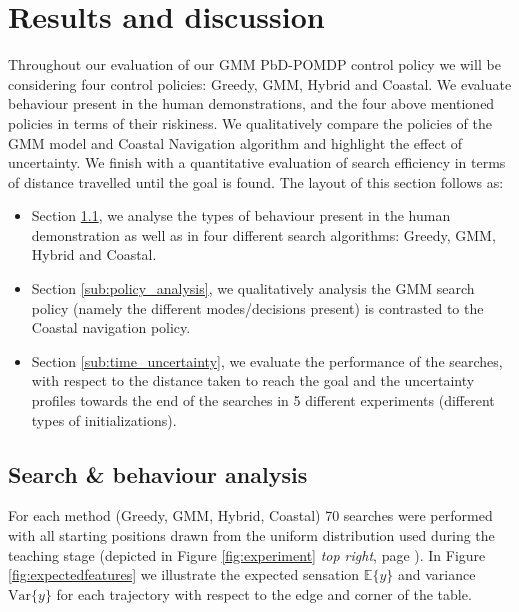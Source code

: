 \section{Results and discussion}\label{chap3:results}

Throughout our evaluation of our GMM PbD-POMDP control policy we will be considering four control policies: Greedy, GMM, Hybrid and 
Coastal. We evaluate behaviour present in the human demonstrations, and the four above mentioned policies in terms 
of their riskiness. We qualitatively compare the policies of the GMM model and Coastal Navigation algorithm and highlight the 
effect of uncertainty. We finish with a quantitative evaluation of search efficiency in terms of distance travelled until the goal is found.
The layout of this section follows as:
\begin{itemize}
 \item Section \ref{sub:search_behaviour}, we analyse the types of behaviour present in the human demonstration as well as in
four different search algorithms: Greedy, GMM, Hybrid and Coastal.
 \item Section \ref{sub:policy_analysis}, we qualitatively analysis the GMM search policy (namely the different modes/decisions present) 
 is contrasted to the Coastal navigation policy.
 \item Section \ref{sub:time_uncertainty}, we evaluate the performance of the searches, with respect to the distance taken to reach the goal and the uncertainty profiles towards the end of 
the searches in 5 different experiments (different types of initializations). 
\end{itemize}
\FloatBarrier
\subsection{Search \& behaviour analysis}\label{sub:search_behaviour}

For each method (Greedy, GMM, Hybrid, Coastal) 70 searches were performed with all starting positions drawn from the
uniform distribution used during the teaching stage (depicted in Figure \ref{fig:experiment} \textit{top right}, page \pageref{fig:experiment}). 
In Figure \ref{fig:expectedfeatures} we illustrate the expected sensation $\mathbb{E}\{y\}$ and  variance $\mathrm{Var}\{y\}$ for each trajectory with respect 
to the edge and corner of the table. 

